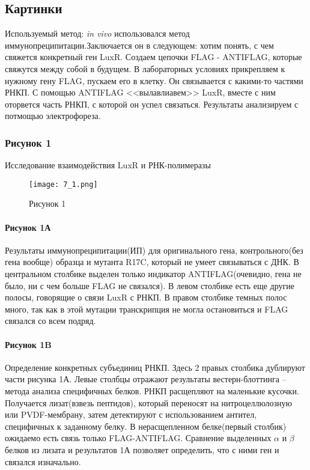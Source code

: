\subsection{Картинки}

Используемый метод: \textit{in vivo} использовался метод иммунопреципитации.Заключается он в следующем: хотим понять, с чем свяжется конкретный ген LuxR. Создаем цепочки FLAG - ANTIFLAG, которые свяжутся между собой в будущем. В лабораторных условиях прикрепляем к нужному гену FLAG, пускаем его в клетку. Он связывается с какими-то частями РНКП. С помощью ANTIFLAG <<вылавлиавем>> LuxR, вместе с ним оторвется часть РНКП, с которой он успел связаться. Результаты анализируем с потмощью электрофореза.

\subsubsection{Рисунок 1}

Исследование взаимодействия LuxR и РНК-полимеразы

\begin{figure}[h]
    \centering
    \texttt{[image: 7\_1.png]}
    \caption{Рисунок 1}
    \label{fig:7_1}
\end{figure}

\paragraph{Рисунок 1А} 

Результаты иммунопреципитации(ИП) для оригинального гена, контрольного(без гена вообще) образца и мутанта R17C, который не умеет связываться с ДНК. В центральном столбике выделен только индикатор ANTIFLAG(очевидно, гена не было, ни с чем больше FLAG не связался). В левом столбике есть еще другие полосы, говорящие о связи LuxR с РНКП. В правом столбике темных полос много, так как в этой мутации транскрипция не могла остановиться и FLAG связался со всем подряд. 
\paragraph{Рисунок 1B}
Определение конкретных субъединиц РНКП. Здесь 2 правых столбика дублируют части рисунка 1А. Левые столбцы отражают результаты вестерн-блоттинга -- метода анализа специфичных белков. РНКП расщепляют на маленькие кусочки. Получается лизат(взвезь пептидов), который переносят на нитроцеллюлозную или PVDF-мембрану, затем детектируют с использованием антител, специфичных к заданному белку. В нерасщепленном белке(первый столбик) ожидаемо есть связь только FLAG-ANTIFLAG. Сравнение выделенных $\alpha$ и $\beta$ белков из лизата и результатов 1А позволяет определить, что с ними ген и связался изначально.

